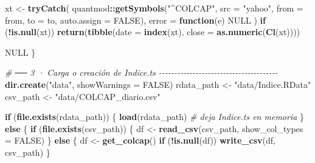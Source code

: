 \documentclass[
  11pt,
]{book}
\newenvironment{Shaded}{\begin{snugshade}}{\end{snugshade}}
\newcommand{\AttributeTok}[1]{\textcolor[rgb]{0.13,0.29,0.53}{#1}}
\newcommand{\CommentTok}[1]{\textcolor[rgb]{0.56,0.35,0.01}{\textit{#1}}}
\newcommand{\ConstantTok}[1]{\textcolor[rgb]{0.56,0.35,0.01}{#1}}
\newcommand{\ControlFlowTok}[1]{\textcolor[rgb]{0.13,0.29,0.53}{\textbf{#1}}}
\newcommand{\FunctionTok}[1]{\textcolor[rgb]{0.13,0.29,0.53}{\textbf{#1}}}
\newcommand{\NormalTok}[1]{#1}
\newcommand{\OtherTok}[1]{\textcolor[rgb]{0.56,0.35,0.01}{#1}}
\newcommand{\SpecialCharTok}[1]{\textcolor[rgb]{0.81,0.36,0.00}{\textbf{#1}}}
\newcommand{\StringTok}[1]{\textcolor[rgb]{0.31,0.60,0.02}{#1}}
\begin{document}
\begin{Shaded}
\begin{Highlighting}[]
\NormalTok{  xt }\OtherTok{\textless{}{-}} \FunctionTok{tryCatch}\NormalTok{(}
\NormalTok{    quantmod}\SpecialCharTok{::}\FunctionTok{getSymbols}\NormalTok{(}\StringTok{"\^{}COLCAP"}\NormalTok{, }\AttributeTok{src =} \StringTok{"yahoo"}\NormalTok{,}
                         \AttributeTok{from =}\NormalTok{ from, }\AttributeTok{to =}\NormalTok{ to, }\AttributeTok{auto.assign =} \ConstantTok{FALSE}\NormalTok{),}
    \AttributeTok{error =} \ControlFlowTok{function}\NormalTok{(e) }\ConstantTok{NULL}
\NormalTok{  )}
  \ControlFlowTok{if}\NormalTok{ (}\SpecialCharTok{!}\FunctionTok{is.null}\NormalTok{(xt))}
    \FunctionTok{return}\NormalTok{(}\FunctionTok{tibble}\NormalTok{(}\AttributeTok{date =} \FunctionTok{index}\NormalTok{(xt), }\AttributeTok{close =} \FunctionTok{as.numeric}\NormalTok{(}\FunctionTok{Cl}\NormalTok{(xt))))}

  \ConstantTok{NULL}
\NormalTok{\}}

\CommentTok{\# ── 3 · Carga o creación de Indice.ts {-}{-}{-}{-}{-}{-}{-}{-}{-}{-}{-}{-}{-}{-}{-}{-}{-}{-}{-}{-}{-}{-}{-}{-}{-}{-}{-}{-}{-}{-}{-}{-}{-}{-}{-}{-}{-}{-}{-}}
\FunctionTok{dir.create}\NormalTok{(}\StringTok{"data"}\NormalTok{, }\AttributeTok{showWarnings =} \ConstantTok{FALSE}\NormalTok{)}
\NormalTok{rdata\_path }\OtherTok{\textless{}{-}} \StringTok{"data/Indice.RData"}
\NormalTok{csv\_path   }\OtherTok{\textless{}{-}} \StringTok{"data/COLCAP\_diario.csv"}

\ControlFlowTok{if}\NormalTok{ (}\FunctionTok{file.exists}\NormalTok{(rdata\_path)) \{}
  \FunctionTok{load}\NormalTok{(rdata\_path)                      }\CommentTok{\# deja Indice.ts en memoria}
\NormalTok{\} }\ControlFlowTok{else}\NormalTok{ \{}
  \ControlFlowTok{if}\NormalTok{ (}\FunctionTok{file.exists}\NormalTok{(csv\_path)) \{}
\NormalTok{    df }\OtherTok{\textless{}{-}} \FunctionTok{read\_csv}\NormalTok{(csv\_path, }\AttributeTok{show\_col\_types =} \ConstantTok{FALSE}\NormalTok{)}
\NormalTok{  \} }\ControlFlowTok{else}\NormalTok{ \{}
\NormalTok{    df }\OtherTok{\textless{}{-}} \FunctionTok{get\_colcap}\NormalTok{()}
    \ControlFlowTok{if}\NormalTok{ (}\SpecialCharTok{!}\FunctionTok{is.null}\NormalTok{(df)) }\FunctionTok{write\_csv}\NormalTok{(df, csv\_path)}
\NormalTok{  \}}


\end{Highlighting}
\end{Shaded}
\end{document}
